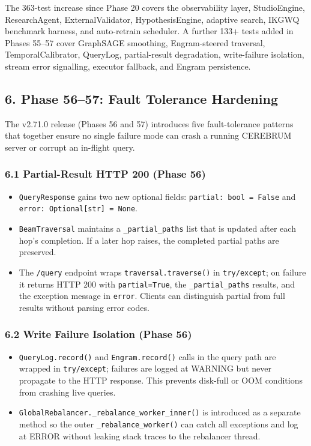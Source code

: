 The 363-test increase since Phase 20 covers the observability layer, StudioEngine, ResearchAgent, ExternalValidator, HypothesisEngine, adaptive search, IKGWQ benchmark harness, and auto-retrain scheduler. A further 133+ tests added in Phases 55--57 cover GraphSAGE smoothing, Engram-steered traversal, TemporalCalibrator, QueryLog, partial-result degradation, write-failure isolation, stream error signalling, executor fallback, and Engram persistence.

\subsection*{6. Phase 56--57: Fault Tolerance Hardening}

The v2.71.0 release (Phases 56 and 57) introduces five fault-tolerance patterns that together ensure no single failure mode can crash a running CEREBRUM server or corrupt an in-flight query.

\subsubsection*{6.1 Partial-Result HTTP 200 (Phase 56)}
\begin{itemize}
  \item \texttt{QueryResponse} gains two new optional fields: \texttt{partial: bool = False} and \texttt{error: Optional[str] = None}.
  \item \texttt{BeamTraversal} maintains a \texttt{\_partial\_paths} list that is updated after each hop's completion. If a later hop raises, the completed partial paths are preserved.
  \item The \texttt{/query} endpoint wraps \texttt{traversal.traverse()} in \texttt{try/except}; on failure it returns HTTP 200 with \texttt{partial=True}, the \texttt{\_partial\_paths} results, and the exception message in \texttt{error}. Clients can distinguish partial from full results without parsing error codes.
\end{itemize}


\subsubsection*{6.2 Write Failure Isolation (Phase 56)}
\begin{itemize}
  \item \texttt{QueryLog.record()} and \texttt{Engram.record()} calls in the query path are wrapped in \texttt{try/except}; failures are logged at WARNING but never propagate to the HTTP response. This prevents disk-full or OOM conditions from crashing live queries.
  \item \texttt{GlobalRebalancer.\_rebalance\_worker\_inner()} is introduced as a separate method so the outer \texttt{\_rebalance\_worker()} can catch all exceptions and log at ERROR without leaking stack traces to the rebalancer thread.
\end{itemize}


